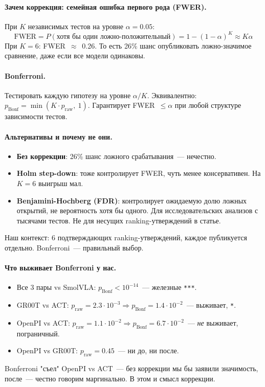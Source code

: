 \documentclass[11pt]{article}
\begin{document}
\paragraph{Зачем коррекция: семейная ошибка первого рода (FWER).} При $K$ независимых тестов на уровне $\alpha = 0.05$:
\[
\text{FWER} = P(\text{хотя бы один ложно-положительный}) = 1 - (1-\alpha)^K \approx K\alpha
\]
При $K=6$: FWER~$\approx$~0.26. То есть 26\% шанс опубликовать ложно-значимое сравнение, даже если все модели одинаковы.

\paragraph{Bonferroni.} Тестировать каждую гипотезу на уровне $\alpha/K$. Эквивалентно: $p_{\text{Bonf}} = \min(K \cdot p_{\text{raw}},\ 1)$. Гарантирует FWER~$\le \alpha$ при любой структуре зависимости тестов.

\paragraph{Альтернативы и почему не они.}
\begin{itemize}[leftmargin=2em, itemsep=1pt]
\item \textbf{Без коррекции}: 26\% шанс ложного срабатывания~--- нечестно.
\item \textbf{Holm step-down}: тоже контролирует FWER, чуть менее консервативен. На $K=6$ выигрыш мал.
\item \textbf{Benjamini-Hochberg (FDR)}: контролирует ожидаемую долю ложных открытий, не вероятность хотя бы одного. Для исследовательских анализов с тысячами тестов. Не для несущих ranking-утверждений в статье.
\end{itemize}
Наш контекст: 6 подтверждающих ranking-утверждений, каждое публикуется отдельно. Bonferroni~--- правильный выбор.

\paragraph{Что выживает Bonferroni у нас.}
\begin{itemize}[leftmargin=2em, itemsep=1pt]
\item Все 3 пары vs SmolVLA: $p_{\text{Bonf}} < 10^{-14}$~--- железные \texttt{***}.
\item GR00T vs ACT: $p_{\text{raw}}=2.3\!\cdot\!10^{-3} \Rightarrow p_{\text{Bonf}}=1.4\!\cdot\!10^{-2}$~--- выживает, \texttt{*}.
\item OpenPI vs ACT: $p_{\text{raw}}=1.1\!\cdot\!10^{-2} \Rightarrow p_{\text{Bonf}}=6.7\!\cdot\!10^{-2}$~--- \emph{не} выживает, пограничный.
\item OpenPI vs GR00T: $p_{\text{raw}}=0.45$~--- ни до, ни после.
\end{itemize}
Bonferroni "съел" OpenPI vs ACT~--- без коррекции мы бы заявили значимость, после~--- честно говорим маргинально. В этом и смысл коррекции.
\end{document}
